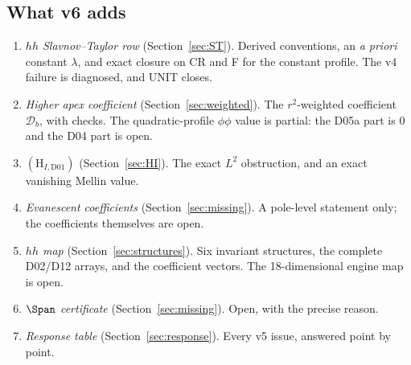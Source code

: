 \subsection{What v6 adds}

\begin{enumerate}[label=\textup{(\alph*)}]
\item \emph{\(hh\) Slavnov--Taylor row}
(Section~\ref{sec:ST}).
Derived conventions, an \emph{a priori} constant \(\lambda\), and
exact closure on CR and F for the constant profile.
The v4 failure is diagnosed, and UNIT closes.
\item \emph{Higher apex coefficient}
(Section~\ref{sec:weighted}).
The \(r^2\)-weighted coefficient \(\mathcal D_b\), with checks.
The quadratic-profile \(\phi\phi\) value is partial: the D05a part
is \(0\) and the D04 part is open.
\item \emph{\((\mathrm H_{I,\mathrm{D01}})\)}
(Section~\ref{sec:HI}).
The exact \(L^2\) obstruction, and an exact vanishing Mellin value.
\item \emph{Evanescent coefficients}
(Section~\ref{sec:missing}).
A pole-level statement only; the coefficients themselves are open.
\item \emph{\(hh\) map}
(Section~\ref{sec:structures}).
Six invariant structures, the complete D02/D12 arrays, and the
coefficient vectors.
The 18-dimensional engine map is open.
\item \emph{\(\Span\) certificate}
(Section~\ref{sec:missing}).
Open, with the precise reason.
\item \emph{Response table}
(Section~\ref{sec:response}).
Every v5 issue, answered point by point.
\end{enumerate}
